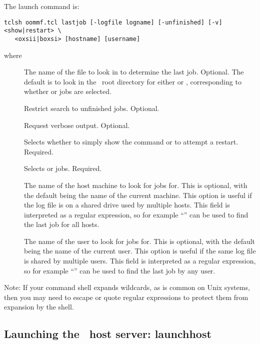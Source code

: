 The  launch command is:
\begin{verbatim}
tclsh oommf.tcl lastjob [-logfile logname] [-unfinished] [-v] <show|restart> \
   <oxsii|boxsi> [hostname] [username]
\end{verbatim}
where
\begin{description}
\item[]
The name of the file to look in to determine the last job.  Optional.
The default is to look in the \OOMMF\ root directory for either
 or , corresponding to whether
\app{oxsii} or \app{boxsi} jobs are selected.
\item[]
Restrict search to unfinished jobs.  Optional.
\item[]
Request verbose output.  Optional.
\item[]
Selects whether to simply show the command or to attempt a restart.
Required.
\item[]
Selects  or  jobs.  Required.
\item[]
The name of the host machine to look for jobs for.  This is optional,
with the default being the name of the current machine.  This option is
useful if the log file is on a shared drive used by multiple hosts.
This field is interpreted as a regular expression, so for example
``\cd{.*}'' can be used to find the last job for all hosts.
\item[]
The name of the user to look for jobs for.  This is optional,
with the default being the name of the current user.  This option is
useful if the same log file is shared by multiple users.
This field is interpreted as a regular expression, so for example
``\cd{.*}'' can be used to find the last job by any user.
\end{description}
Note: If your command shell expands wildcards, as is common on Unix
systems, then you may need to escape or quote regular expressions to
protect them from expansion by the shell.



\subsection{Launching the \OOMMF\ host server:
   launchhost\label{sec:launchhost}}%

